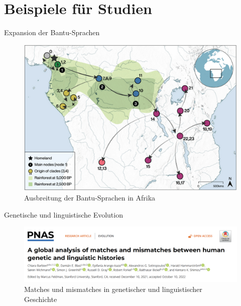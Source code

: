 \section{Beispiele für Studien}
\begin{frame}{Expansion der Bantu-Sprachen}
\vspace*{-0.3cm}
	\begin{figure}
		\includegraphics[height=0.75\textheight]{images/bantu.png}
		\caption{Ausbreitung der Bantu-Sprachen in Afrika \parencite{Koile2022}}
	\end{figure}
\end{frame}

\begin{frame}{Genetische und linguistische Evolution}
\vspace*{-0.3cm}
	\begin{figure}
		\includegraphics[width=1.1\linewidth]{images/gelato.png}
		\caption{Matches und mismatches in genetischer und linguistischer Geschichte \parencite{Barbieri2022}}
	\end{figure}
\end{frame}

